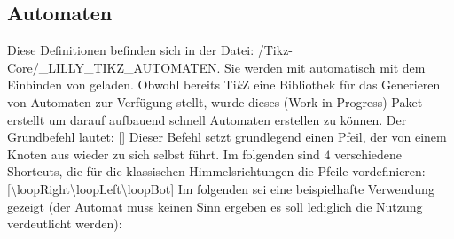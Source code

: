 \subsection{Automaten }
Diese Definitionen befinden sich in der Datei: {\ltt\LILLYxPATHxGRAPHICS/Tikz-Core/\_LILLY\_TIKZ\_AUTOMATEN}. Sie werden mit  automatisch mit dem Einbinden von\newline {} geladen.\medskip\newline
Obwohl bereits Ti\textit{k}Z eine Bibliothek für das Generieren von Automaten zur Verfügung stellt, wurde dieses (Work in Progress) Paket erstellt um darauf aufbauend schnell Automaten erstellen zu können. Der Grundbefehl lautet:\medskip
%
%
%
[]
Dieser Befehl setzt grundlegend einen Pfeil, der von einem Knoten aus wieder zu sich selbst führt. Im folgenden sind $4$ verschiedene Shortcuts, die für die klassischen Himmelsrichtungen die Pfeile vordefinieren:\medskip
%
%
%
[\cmdlist \textbackslash loopRight\secline{}\cmdlist\textbackslash loopLeft\cmdlist\secline\textbackslash loopBot]
Im folgenden sei eine beispielhafte Verwendung gezeigt (der Automat muss keinen Sinn ergeben es soll lediglich die Nutzung verdeutlicht werden):

